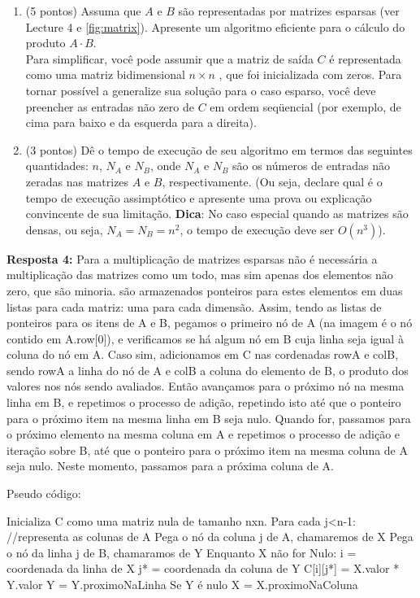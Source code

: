 \documentclass{article}
\begin{document}
\begin{enumerate}[label*=4.\arabic*.]
  \item (5 pontos) Assuma que $A$ e $B$ são representadas por matrizes esparsas (ver Lecture 4 e \autoref{fig:matrix}). Apresente um algoritmo eficiente para o cálculo do produto $A\cdot B$. \\
  Para simplificar, você pode assumir que a matriz de saída $C$ é representada como uma matriz bidimensional $n \times n$ , que foi inicializada com zeros.
  Para tornar possível a generalize sua solução para o caso esparso, você deve preencher as entradas não zero de $C$ em ordem seqüencial (por exemplo, de cima para baixo e da esquerda para a direita).
  \item (3 pontos) Dê o tempo de execução de seu algoritmo em termos das seguintes quantidades: $n$, $N_A$ e $N_B$, onde $N_A$ e $N_B$ são os números de entradas não zeradas nas matrizes $A$ e $B$, respectivamente. (Ou seja, declare qual é o tempo de execução assimptótico e apresente uma prova ou explicação convincente de sua limitação. \textbf{Dica}: No caso especial quando as matrizes são densas, ou seja, $N_A = N_B = n^2$, o tempo de execução deve ser $O(n^3)$).
\end{enumerate}

\textbf{Resposta 4:}
Para a multiplicação de matrizes esparsas não é necessária a multiplicação das matrizes como um todo, mas sim apenas dos elementos não zero, que são minoria.
são armazenados ponteiros para estes elementos em duas listas para cada matriz: uma para cada dimensão. Assim, tendo as listas de ponteiros para os itens de A e B, pegamos o primeiro nó de A (na imagem é o nó contido em A.row[0]), e verificamos se há algum nó em B cuja linha seja igual à coluna do nó em A. Caso sim, adicionamos em C nas cordenadas rowA e colB, sendo rowA a linha do nó de A e colB a coluna do elemento de B, o produto dos valores nos nós sendo avaliados. Então avançamos para o próximo nó na mesma linha em B, e repetimos o processo de adição, repetindo isto até que o ponteiro para o próximo item na mesma linha em B seja nulo. Quando for, passamos para o próximo elemento na mesma coluna em A e repetimos o processo de adição e iteração sobre B, até que o ponteiro para o próximo item na mesma coluna de A seja nulo. Neste momento, passamos para a próxima coluna de A.

Pseudo código:

Inicializa C como uma matriz nula de tamanho nxn.
Para cada j<n-1: //representa as colunas de A
    Pega o nó da coluna j de A, chamaremos de X
    Pega o nó da linha j de B, chamaramos de Y
    Enquanto X não for Nulo:
        i = coordenada da linha de X
        j* = coordenada da coluna de Y
        C[i][j*] = X.valor * Y.valor
        Y = Y.proximoNaLinha
        Se Y é nulo
            X = X.proximoNaColuna
\end{document}
